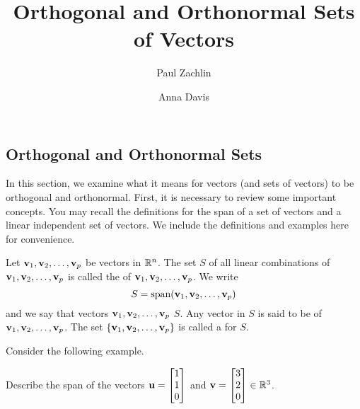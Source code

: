 \documentclass{ximera}
\author{Paul Zachlin \and Anna Davis} \title{Orthogonal and Orthonormal Sets of Vectors} \license{CC-BY 4.0}
\begin{document}
\begin{abstract}

\end{abstract}
\maketitle
\subsection{Orthogonal and Orthonormal Sets}

In this section, we examine what it means for vectors (and sets of
vectors) to be orthogonal and orthonormal. First, it is necessary to
review some important concepts. You may recall the definitions for the
span of a set of vectors and a linear independent set of vectors. We
include the definitions and examples here for convenience.

\begin{definition}\label{def:spanReprise} Let ${\bf v}_1, {\bf v}_2,\ldots ,{\bf v}_p$ be vectors in $\mathbb{R}^n$.  The set $S$ of all linear combinations of ${\bf v}_1, {\bf v}_2,\ldots ,{\bf v}_p$ is called the  of ${\bf v}_1, {\bf v}_2,\ldots ,{\bf v}_p$.  We write 
$$S=\mbox{span}({\bf v}_1, {\bf v}_2,\ldots ,{\bf v}_p)$$
and we say that vectors ${\bf v}_1, {\bf v}_2,\ldots ,{\bf v}_p$  $S$.  Any vector in $S$ is said to be  of ${\bf v}_1, {\bf v}_2,\ldots ,{\bf v}_p$.  The set $\{{\bf v}_1, {\bf v}_2,\ldots ,{\bf v}_p\}$ is called a  for $S$.
\end{definition}

Consider the following example.

\begin{example}\label{spanvectors}
Describe the span of the vectors ${\bf u}=\begin{bmatrix}
1  \\ 1 \\ 0
\end{bmatrix}$ and
${\bf v}=\begin{bmatrix}
3  \\ 2 \\ 0
\end{bmatrix} \in \mathbb{R}^{3}$.
\end{example}
\end{document}
